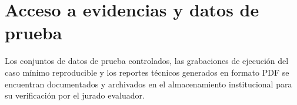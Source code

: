 \documentclass[12pt,oneside]{report}
\begin{document}
\section{Acceso a evidencias y datos de prueba}
Los conjuntos de datos de prueba controlados, las grabaciones de ejecución del caso mínimo reproducible y los reportes técnicos generados en formato PDF se encuentran documentados y archivados en el almacenamiento institucional para su verificación por el jurado evaluador.
\end{document}
